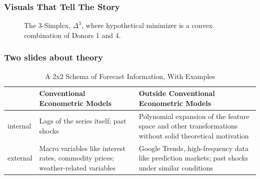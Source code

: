 \documentclass[9pt]{beamer}
\theoremstyle{definition}
\begin{document}
\begin{frame}\frametitle{Visuals That Tell The Story}

\begin{figure}
    \centering
    \caption{The 3-Simplex, $\Delta^{3}$, where hypothetical minimizer is a convex combination of Donors 1 and 4.}
    \end{figure}
    
\end{frame}

\begin{frame}\frametitle{Two slides about theory}
   
    \begin{table}[htb]
        \centering %
        \caption{A 2x2 Schema of Forecast Information, With Examples}
        \begin{tabular}{ | p{1cm} | p{4.8cm}| p{4.8cm} | } 
          \hline
          & Conventional Econometric Models & Outside Conventional Econometric Models\\ 
          \hline
          internal & Lags of the series itself; past shocks & Polynomial expansion of the feature space and other transformations without solid theoretical motivation \\
          \hline
          external & Macro variables like interest rates, commodity prices; weather-related variables & Google Trends, high-frequency data like prediction markets; past shocks under similar conditions \\ 
          \hline
        \end{tabular}
      \end{table}
\end{frame}
\end{document}
